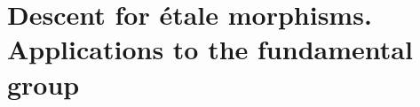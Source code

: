 \setcounter{chapter}{8}
\chapter{Descent for étale morphisms. Applications to the fundamental group}
